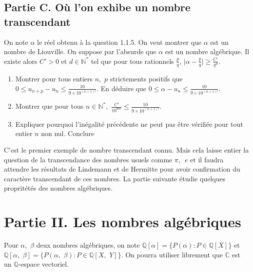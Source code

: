 \documentclass{article}
\begin{document}
\subsection{Partie C. Où l'on exhibe un nombre transcendant}
On note $\alpha$ le réel obtenu à la question 1.1.5. On veut montrer que $\alpha$ est un nombre de Liouville. On suppose par l'absurde que $\alpha$ est un nombre algébrique. Il existe alors $C' > 0$ et $d\in\mathbb{N}^*$ tel que pour tous rationnels $\frac{p}{q}$, $\Big|\alpha-\frac{p}{q}\Big|\geq \frac{C'}{q^d}$.
\begin{enumerate}
	\item Montrer pour tous entiers $n,\,\, p$ strictements positifs que $0\leq u_{n+p} - u_n\leq \frac{10}{9\times 10^{(n+1)!}}$. En déduire que $0\leq \alpha-u_n\leq \frac{10}{9\times 10^{(n+1)!}}$.
	\item Montrer que pour tous $n\in\mathbb{N}^*,\,\, \frac{C'}{10^{d n!}}\leq \frac{10}{9\times 10^{(n+1)!}}$.
\item Expliquer pourquoi l'inégalité précédente ne peut pas être vérifiée pour tout entier $n$ non nul. Conclure
	\end{enumerate}
	C'est le premier exemple de nombre transcendant connu. Mais cela laisse entier la question de la transcendance des nombres usuels comme $\pi,\,\,\, e$ et il faudra attendre les résultats de Lindemann et de Hermitte pour avoir confirmation du caractère transcendant de ces nombres. La partie suivante étudie quelques propritétés des nombres algébriques.
	\section{Partie II. Les nombres algébriques}
	Pour $\alpha,\,\,\beta$ deux nombres algébriques, on note $\mathbb{Q}[\alpha] = \{P(\alpha) : P\in\mathbb{Q}[X]\}$ et $\mathbb{Q}[\alpha,\,\, \beta] = \{P(\alpha,\,\,\beta) : P\in\mathbb{Q}[X,\,\,Y]\}$. On pourra utiliser librement que $\mathbb{C}$ est un $\mathbb{Q}$-espace vectoriel.
\end{document}
